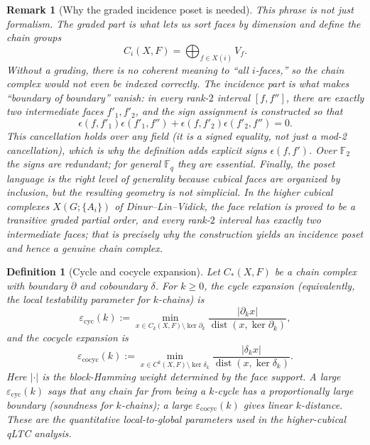 \documentclass[10pt]{article}
\theoremstyle{compactdef}
\newtheorem{definition}{Definition}
\newtheorem*{remark}{Remark}
\begin{document}
\begin{remark}[Why the graded incidence poset is needed]
This phrase is not just formalism. The \emph{graded} part is what lets us sort faces by dimension and define the chain groups
\[
C_i(X,F)=\bigoplus_{f\in X(i)}V_f.
\]
Without a grading, there is no coherent meaning to ``all $i$-faces,'' so the chain complex would not even be indexed correctly. The \emph{incidence} part is what makes ``boundary of boundary'' vanish: in every rank-$2$ interval $[f,f'']$, there are exactly two intermediate faces $f'_1,f'_2$, and the sign assignment is constructed so that
\[
\epsilon(f,f'_1)\epsilon(f'_1,f'')+\epsilon(f,f'_2)\epsilon(f'_2,f'')=0.
\]
This cancellation holds over \emph{any} field (it is a signed equality, not just a mod-2 cancellation), which is why the definition adds explicit signs $\epsilon(f,f')$. Over $\mathbb F_2$ the signs are redundant; for general $\mathbb F_q$ they are essential. Finally, the \emph{poset} language is the right level of generality because cubical faces are organized by inclusion, but the resulting geometry is not simplicial. In the higher cubical complexes $X(G;\{A_i\})$ of Dinur--Lin--Vidick, the face relation is proved to be a transitive graded partial order, and every rank-$2$ interval has exactly two intermediate faces; that is precisely why the construction yields an incidence poset and hence a genuine chain complex.~\cite{DLV}
\end{remark}

\begin{definition}[Cycle and cocycle expansion]
Let $C_*(X,F)$ be a chain complex with boundary $\partial$ and coboundary $\delta$. For $k\ge 0$, the \emph{cycle expansion} (equivalently, the local testability parameter for $k$-chains) is
\[
\varepsilon_{\mathrm{cyc}}(k):=\min_{x\in C_k(X,F)\setminus \ker \partial_k}
\frac{|\partial_k x|}{\operatorname{dist}(x,\ker \partial_k)},
\]
and the \emph{cocycle expansion} is
\[
\varepsilon_{\mathrm{cocyc}}(k):=\min_{x\in C^k(X,F)\setminus \ker \delta_k}
\frac{|\delta_k x|}{\operatorname{dist}(x,\ker \delta_k)}.
\]
Here $|\cdot|$ is the block-Hamming weight determined by the face support. A large $\varepsilon_{\mathrm{cyc}}(k)$ says that any chain far from being a $k$-cycle has a proportionally large boundary (soundness for $k$-chains); a large $\varepsilon_{\mathrm{cocyc}}(k)$ gives linear $k$-distance. These are the quantitative \emph{local-to-global parameters} used in the higher-cubical qLTC analysis.~\cite{DLV}
\end{definition}
\end{document}
